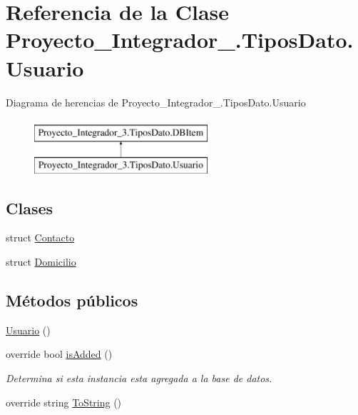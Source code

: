 \hypertarget{class_proyecto___integrador__3_1_1_tipos_dato_1_1_usuario}{\section{Referencia de la Clase Proyecto\-\_\-\-Integrador\-\_.\-Tipos\-Dato.\-Usuario}
\label{class_proyecto___integrador__3_1_1_tipos_dato_1_1_usuario}
}
Diagrama de herencias de Proyecto\-\_\-\-Integrador\-\_.\-Tipos\-Dato.\-Usuario\begin{figure}[H]
\begin{center}
\leavevmode
\includegraphics[height=2.000000cm]{class_proyecto___integrador__3_1_1_tipos_dato_1_1_usuario}
\end{center}
\end{figure}
\subsection*{Clases}
\begin{DoxyCompactItemize}
\item 
struct \hyperlink{struct_proyecto___integrador__3_1_1_tipos_dato_1_1_usuario_1_1_contacto}{Contacto}
\item 
struct \hyperlink{struct_proyecto___integrador__3_1_1_tipos_dato_1_1_usuario_1_1_domicilio}{Domicilio}
\end{DoxyCompactItemize}
\subsection*{Métodos públicos}
\begin{DoxyCompactItemize}
\item 
\hyperlink{class_proyecto___integrador__3_1_1_tipos_dato_1_1_usuario_a4b727b3cfd600bbecd0f5a2673152110}{Usuario} ()
\item 
override bool \hyperlink{class_proyecto___integrador__3_1_1_tipos_dato_1_1_usuario_a6ebae0d39a68af27c93fd85719bb1664}{is\-Added} ()
\begin{DoxyCompactList}\small\item\em Determina si esta instancia esta agregada a la base de datos. \end{DoxyCompactList}\item 
override string \hyperlink{class_proyecto___integrador__3_1_1_tipos_dato_1_1_usuario_ad04ec01ff1bc03efc0d4defd5589ba52}{To\-String} ()
\end{DoxyCompactItemize}
